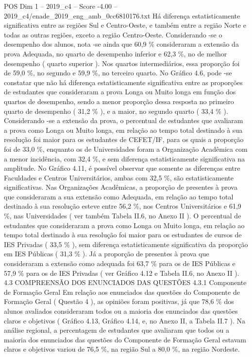 \begin{textsample}{POS Dim 1 – 2019\_c4 – Score -4.00 – 2019\_c4/enade\_2019\_eng\_amb\_0cc6810176.txt}
Há diferença estatisticamente significativa entre as regiões Sul e Centro-Oeste, e também entre a região Norte e todas as outras regiões, exceto a região Centro-Oeste.
Considerando -se o desempenho dos alunos, nota -se ainda que 60,9 \% consideraram a extensão da prova Adequada, no quarto de desempenho inferior e 62,3 \%, no de melhor desempenho ( quarto superior ).
Nos quartos intermediários, essa proporção foi de 59,0 \%, no segundo e 59,9 \%, no terceiro quarto.
No Gráfico 4.6, pode -se constatar que não há diferença estatisticamente significativa entre as proporções de estudantes que consideraram a prova Longa ou Muito longa em função dos quartos de desempenho, sendo a menor proporção dessa resposta no primeiro quarto de desempenho ( 31,2 \% ), e a maior, no segundo quarto ( 33,4 \% ).
Considerando -se a extensão da prova, o percentual de estudantes que avaliaram a prova como Longa ou Muito longa, em relação ao tempo total destinado à sua resolução foi maior para os estudantes de CEFET/IF, para os quais a proporção foi de 33,0 \%, enquanto os de Universidades foram a Organização Acadêmica com a menor incidência, com 32,4 \%, e sem diferença estatisticamente significativa na amplitude.
No Gráfico 4.11, é possível observar que somente as diferenças entre Faculdades e Centros Universitários, ambas com 32,5 \%, são estatisticamente significativas.
Nas Organizações Acadêmicas, a proporção de presentes à prova que consideraram a sua extensão como Adequada, em relação ao tempo total destinado à sua resolução esteve entre 56,2 \%, nos Centros Universitários e 61,9 \%, nas Universidades ( ver também Tabela II.6, no Anexo II ).
O percentual de estudantes que consideraram a prova como Longa ou Muito longa, em relação ao tempo total destinado à sua resolução foi maior para os estudantes de cursos de IES Privadas ( 33,5 \% ), sem diferença estatisticamente significativa da proporção em IES Públicas ( 31,3 \% ).
Já a proporção de presentes à prova que consideraram a extensão como adequada foi 63,7 \% para os de IES Públicas e 57,9 \% para os de IES Privadas ( ver Gráfico 4.12 e Tabela II.6, no Anexo II ). 4.3 COMPREENSÃO DOS ENUNCIADOS DAS QUESTÕES 4.3.1 Componente de Formação Geral Em relação aos enunciados das questões do Componente de Formação Geral ( Questão 4 ), as opiniões foram positivas, já que 78,6 \% dos alunos avaliados consideraram todos ou a maioria dos enunciados das questões claros e objetivos ( Gráfico 4.13, Gráfico 4.14, e, no Anexo II, a Tabela II.7 ).
Na análise regional, a percentagem de estudantes que avaliaram que todos ou a maioria dos enunciados das questões do Componente de Formação Geral estavam claros e objetivos variou de 76,5 \%, na região Sul a 80,0 \%, na região Nordeste.

\end{textsample}
